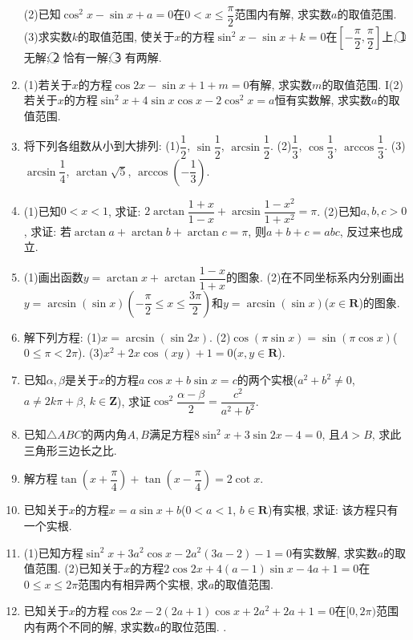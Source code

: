 \documentclass[10pt,a4paper]{article}
\begin{document}
\begin{enumerate}[1.]
(2)已知$\cos ^2x-\sin x+a=0$在$0<x\le \dfrac{\pi }2$范围内有解, 求实数$a$的取值范围.
(3)求实数$k$的取值范围, 使关于$x$的方程$\sin ^2x-\sin x+k=0$在$[-\dfrac{\pi }2,\dfrac{\pi }2]$上, \textcircled{1} 无解; \textcircled{2} 恰有一解; \textcircled{3} 有两解.
\item (1)若关于$x$的方程$\cos 2x-\sin x+1+m=0$有解, 求实数$m$的取值范围.
I(2)若关于$x$的方程$\sin ^2x+4\sin x\cos x-2\cos ^2x=a$恒有实数解, 求实数$a$的取值范围.
\item 将下列各组数从小到大排列:
(1)$\dfrac 12$, $\sin \dfrac 12$, $\arcsin \dfrac 12$.				(2)$\dfrac 13$, $\cos \dfrac 13$, $\arccos \dfrac 13$.
(3)$\arcsin \dfrac 14$, $\arctan \sqrt 5$, $\arccos (-\dfrac 13)$.
\item (1)已知$0<x<1$, 求证: $2\arctan \dfrac{1+x}{1-x}+\arcsin \dfrac{1-x^2}{1+x^2}=\pi$.
(2)已知$a,b,c>0$, 求证: 若$\arctan a+\arctan b+\arctan c=\pi$, 则$a+b+c=abc$, 反过来也成立.
\item (1)画出函数$y=\arctan x+\arctan \dfrac{1-x}{1+x}$的图象.
(2)在不同坐标系内分别画出$y=\arcsin (\sin x)(-\dfrac{\pi }2\le x\le \dfrac{3\pi }2)$和$y=\arcsin (\sin x)$($x\in \mathbf{R}$)的图象.
\item 解下列方程:
(1)$x=\arcsin (\sin 2x)$.
(2)$\cos (\pi \sin x)=\sin (\pi \cos x)$($0\le \pi <2\pi$).
(3)$x^2+2x\cos (xy)+1=0$($x,y\in \mathbf{R}$).
\item 已知$\alpha ,\beta$是关于$x$的方程$a\cos x+b\sin x=c$的两个实根($a^2+b^2\ne 0$, $a\ne 2k\pi +\beta$, $k\in \mathbf{Z}$), 求证$\cos ^2\dfrac{\alpha -\beta}2=\dfrac{c^2}{a^2+b^2}$.
\item 已知$\triangle ABC$的两内角$A,B$满足方程$8\sin ^2x+3\sin 2x-4=0$, 且$A>B$, 求此三角形三边长之比.
\item 解方程$\tan (x+\dfrac{\pi }4)+\tan (x-\dfrac{\pi }4)=2\cot x$.
\item 已知关于$x$的方程$x=a\sin x+b$($0<a<1$, $b\in \mathbf{R}$)有实根, 求证: 该方程只有一个实根.
\item (1)已知方程$\sin ^2x+3a^2\cos x-2a^2(3a-2)-1=0$有实数解, 求实数$a$的取值范围.
(2)已知关于$x$的方程$2\cos 2x+4(a-1)\sin x-4a+1=0$在$0\le x\le 2\pi$范围内有相异两个实根, 求$a$的取值范围.
\item 已知关于$x$的方程$\cos 2x-2(2a+1)\cos x+2a^2+2a+1=0$在$[0,2\pi)$范围内有两个不同的解, 求实数$a$的取位范围.
.



\end{enumerate}
\end{document}
